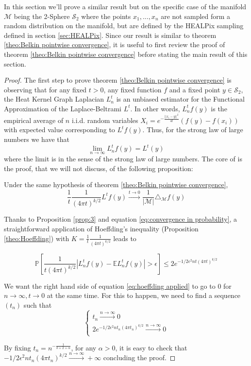 In this section we'll prove a similar result but on the specific case of the manifold $\mathcal M$ being the 2-Sphere $\mathcal S_2$ where the points $x_1, ..., x_n$ are not sampled form a random distribution on the manifold, but are defined by the HEALPix sampling defined in section \ref{sec:HEALPix}. Since our result is similar to theorem \ref{theo:Belkin pointwise convergence}, it is useful to first review the proof of theorem \ref{theo:Belkin pointwise convergence} before stating the main result of this section.
\begin{proof}
The first step to prove theorem \ref{theo:Belkin pointwise convergence} is observing that for any fixed $t>0$, any fixed function $f$ and a fixed point $y\in\mathcal S_2$,  the Heat Kernel Graph Laplacian $L_n^t$ is an unbiased estimator for the Functional Approximation of the Laplace-Beltrami $L^t$. In other words, $L_n^tf(y)$ is the empirical average of $n$ i.i.d. random variables $X_i= e^{-\frac{||x_i-y||^2}{4t}}\left(f(y)-f(x_i)\right)$ with expected value corresponding to $L^tf(y)$. Thus, for the strong law of large numbers we have that
\begin{equation}
\label{eq:convergence in probability}
\lim_{n\to\infty}L_n^tf(y) = L^t(y)
\end{equation}
where the limit is in the sense of the strong law of large numbers.
The core of \cite{Belkin:2005:TTF:2138147.2138189} is the proof, that we will not discuss, of the following proposition:

\begin{prop} Under the same hypothesis of theorem \ref{theo:Belkin pointwise convergence},
	$$\frac{1}{t}\frac{1}{(4\pi t)^{k/2}} L^tf(y) \xrightarrow{t\to 0 } \frac{1}{|\mathcal M|}\triangle_{\mathcal M}f(y)$$
	\label{prop:3}
\end{prop}

Thanks to Proposition \ref{prop:3} and equation \ref{eq:convergence in probability}, a straightforward application of Hoeffding's inequality (Proposition \ref{theo:Hoeffding}) with $K=\frac{1}{t}\frac{1}{(4\pi t)^{k/2}}$ leads to

\begin{equation}
	\label{eq:hoeffding applied}
	\mathbb{P}\left[\frac{1}{t(4 \pi t)^{k / 2}}\left|L_{n}^{t} f(y)-\mathbb{E} L_{n}^{t} f(y)\right|>\epsilon\right] \leq 2 e^{-1 / 2 \epsilon^{2} n t(4 \pi t)^{k / 2}}
\end{equation}

We want the right hand side of equation \ref{eq:hoeffding applied} to go to $0$ for $n\to\infty, t\to0$ at the same time. For this to happen, we need to find a sequence $(t_n)$ such that 
$$\begin{cases}
t_n\xrightarrow{n\to\infty}0\\
2 e^{-1 / 2 \epsilon^{2} n t_n(4 \pi t_n)^{k / 2}}\xrightarrow{n\to\infty}0\\
\end{cases}$$

By fixing $t_n=n^{-\frac{1}{k+2+\alpha}}$, for any $\alpha>0$, it is easy to check that $-1 / 2 \epsilon^{2} n t_n(4 \pi t_n)^{k / 2}\xrightarrow{n\to\infty}+\infty$ concluding the proof.

\end{proof}

